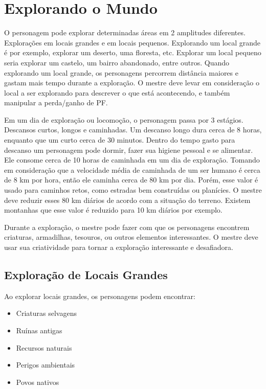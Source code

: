 \chapter{Explorando o Mundo}
\label{cap:explorando}

O personagem pode explorar determinadas áreas em 2 amplitudes diferentes. Explorações em locais grandes e em locais pequenos. Explorando um local grande é por exemplo, explorar um deserto, uma floresta, etc. Explorar um local pequeno seria explorar um castelo, um bairro abandonado, entre outros. Quando explorando um local grande, os personagens percorrem distância maiores e gastam mais tempo durante a exploração. O mestre deve levar em consideração o local a ser explorando para descrever o que está acontecendo, e também manipular a perda/ganho de PF.

Em um dia de exploração ou locomoção, o personagem passa por 3 estágios. Descansos curtos, longos e caminhadas. Um descanso longo dura cerca de 8 horas, enquanto que um curto cerca de 30 minutos. Dentro do tempo gasto para descanso um personagem pode dormir, fazer sua higiene pessoal e se alimentar. Ele consome cerca de 10 horas de caminhada em um dia de exploração. Tomando em consideração que a velocidade média de caminhada de um ser humano é cerca de 8 km por hora, então ele caminha cerca de 80 km por dia. Porém, esse valor é usado para caminhos retos, como estradas bem construídas ou planícies. O mestre deve reduzir esses 80 km diários de acordo com a situação do terreno. Existem montanhas que esse valor é reduzido para 10 km diários por exemplo. 

Durante a exploração, o mestre pode fazer com que os personagens encontrem criaturas, armadilhas, tesouros, ou outros elementos interessantes. O mestre deve usar sua criatividade para tornar a exploração interessante e desafiadora.

\section{Exploração de Locais Grandes}

Ao explorar locais grandes, os personagens podem encontrar:

\begin{itemize}
    \item Criaturas selvagens
    \item Ruínas antigas
    \item Recursos naturais
    \item Perigos ambientais
    \item Povos nativos
\end{itemize}

